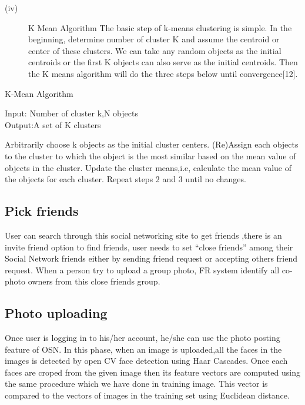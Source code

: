  \begin{description} 
 \item[(iv)]K Mean Algorithm
The basic step of k-means clustering is simple. In the beginning, determine number of cluster K and assume the centroid or center of these clusters. We can take any random objects as the initial centroids or the first K objects can also serve as the initial centroids. Then the K means algorithm will do the three steps below until convergence[12].
     \end{description}     
      \begin{algorithm}
\caption{K-Mean  Algorithm }
   Input: Number of cluster k,N objects\\
   Output:A set of K clusters\\
\begin{algorithmic}[1]
\State Arbitrarily choose k objects as the initial cluster centers.
\State (Re)Assign each objects to the cluster to which the object is the most similar based on the mean value of objects in the cluster.  
\State Update the cluster means,i.e, calculate the mean value of the objects for each cluster.
\State Repeat steps 2 and 3 until no changes.
\end{algorithmic}
\end{algorithm}
 \subsection[Pick Friends]{Pick friends}
 \noindent
User can search through this social networking site to get friends ,there is an invite friend option to find friends, user needs to set “close friends” among their Social Network friends either by sending friend request or accepting others friend request. When a person try to upload a group photo, FR system identify all co-photo owners from this close friends group.
\subsection[Photo Uploading]{Photo uploading}
\noindent 
Once  user is logging in to his/her account, he/she can use the photo posting feature of OSN.
In this phase, when an image is uploaded,all the faces in the images is detected by open CV  face detection  using Haar Cascades. Once each faces are croped from the given image then its feature vectors are computed using the same procedure which we have done in training image. This vector is compared to the vectors of images in the training set using Euclidean distance.

